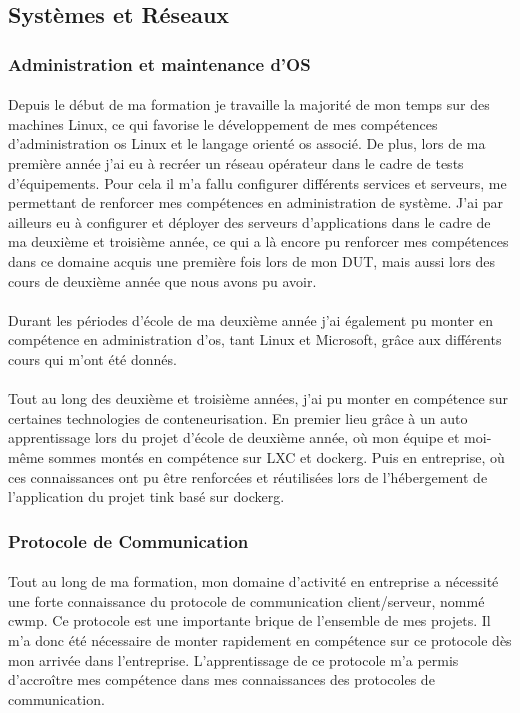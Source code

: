 \documentclass[12pt,a4paper]{report}
\begin{document}
\subsection{Systèmes et Réseaux}
\subsubsection{Administration et maintenance d'OS}
\paragraph*{}Depuis le début de ma formation je travaille la majorité de mon temps sur des machines Linux, ce qui favorise le développement de mes compétences d'administration \gls{os} Linux et le langage orienté \gls{os} associé. De plus, lors de ma première année j'ai eu à recréer un réseau opérateur dans le cadre de tests d'équipements. Pour cela il m'a fallu configurer différents services et serveurs, me permettant de renforcer mes compétences en administration de système. J'ai par ailleurs eu à configurer et déployer des serveurs d'applications dans le cadre de ma deuxième et troisième année, ce qui a là encore pu renforcer mes compétences dans ce domaine acquis une première fois lors de mon DUT, mais aussi lors des cours de deuxième année que nous avons pu avoir.
\paragraph*{}Durant les périodes d'école de ma deuxième année j'ai également pu monter en compétence en administration d'\gls{os}, tant Linux et Microsoft, grâce aux différents cours qui m'ont été donnés.
\paragraph*{}Tout au long des deuxième et troisième années, j'ai pu monter en compétence sur certaines technologies de conteneurisation. En premier lieu grâce à un auto apprentissage lors du projet d'école de deuxième année, où mon équipe et moi-même sommes montés en compétence sur LXC et \gls{dockerg}. Puis en entreprise, où ces connaissances ont pu être renforcées et réutilisées lors de l'hébergement de l'application du projet \gls{tink} basé sur \gls{dockerg}. \\
\subsubsection{Protocole de Communication}
\paragraph*{}Tout au long de ma formation, mon domaine d'activité en entreprise a nécessité une forte connaissance du protocole de communication client/serveur, nommé \gls{cwmp}. Ce protocole est une importante brique de l'ensemble de mes projets. Il m'a donc été nécessaire de monter rapidement en compétence sur ce protocole dès mon arrivée dans l'entreprise. L’apprentissage de ce protocole m'a permis d'accroître mes compétence dans mes connaissances des protocoles de communication.
\end{document}
